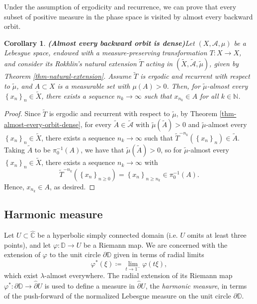\documentclass[11pt]{article}
\newtheorem{corol}[thm]{Corollary}
\theoremstyle{definition}
\theoremstyle{remark}
\newcounter{main}
\theoremstyle{plain}
\begin{document}
Under the assumption of ergodicity and recurrence, we can prove that every subset of positive measure in the phase space is visited by almost every backward orbit.
\begin{corol}{\bf (Almost every backward orbit is dense)}\label{prop-ergodic-properties-natural-ext2}
		Let $ (X,\mathcal{A},\mu) $ be a Lebesgue space, endowed with a measure-preserving transformation $ T\colon X \to X $, and consider its Rokhlin's natural extension $ \widetilde{T} $ acting in $ (\widetilde{X},\widetilde{\mathcal{A}},\widetilde{\mu}) $, given by Theorem \ref{thm-natural-extension}. Assume $ \widetilde{T} $  is ergodic and recurrent with respect to $ \widetilde{\mu} $,  and  $ A\subset X $ is a measurable set  with $ \mu(A)>0 $. Then, for $ \widetilde{\mu} $-almost every $ \left\lbrace x_n\right\rbrace _n\in \widetilde{X }$, there exists a sequence $ n_k\to \infty $ such that $ x_{n_k}\in A $ for all $k\in\mathbb{N}$.   
\end{corol}
\begin{proof}
	Since $ \widetilde{T} $  is ergodic and recurrent with respect to $ \widetilde{\mu} $,  by Theorem \ref{thm-almost-every-orbit-dense}, for every  $ \widetilde{A}\in\widetilde{\mathcal{A}} $ with $ \widetilde{\mu} (\widetilde{A})>0 $ and $ \widetilde{\mu} $-almost every $ \left\lbrace x_n\right\rbrace _n\in \widetilde{X }$, there exists a sequence $ n_k\to \infty $ such that $ \widetilde{T}^{-n_k}(\left\lbrace x_n\right\rbrace _n)\in \widetilde{A} $. Taking $ \widetilde{A} $ to be $ \pi_0^{-1}(A) $,  we have that $ \widetilde{\mu} (\widetilde{A})>0 $,  so for $ \widetilde{\mu} $-almost every $ \left\lbrace x_n\right\rbrace _n\in \widetilde{X }$, there exists a sequence $ n_k\to \infty $ with $$ \widetilde{T}^{-n_k}(\left\lbrace x_n\right\rbrace _{n\geq 0})= \left\lbrace x_n\right\rbrace _{n\geq n_k} \in \pi_0^{-1}(A)  .$$ Hence, $ x_{n_k}\in A $, as desired.
\end{proof}
\subsection{Harmonic measure}\label{subsect_harmonic_measure}
Let $ U \subset\widehat{\mathbb{C}}$ be a hyperbolic simply connected domain (i.e. $ U $ omits at least three points), and let 
 $ \varphi\colon\mathbb{D}\to U $ be a Riemann map. We are concerned with the extension of $ \varphi $ to the unit circle $ \partial\mathbb{D} $ given in terms of radial limits \[\varphi^*(\xi)\coloneqq \lim\limits_{t\to 1^-}\varphi(t\xi) ,\] which exist $ \lambda $-almost everywhere. The radial extension of its Riemann map  $\varphi^*\colon \partial \mathbb{D}\to \widehat{\partial} U$  is used to define a measure in $ \widehat{\partial} U $, the {\em harmonic measure},  in terms of the push-forward of the normalized Lebesgue measure on the unit circle $ \partial\mathbb{D} $.
\end{document}
